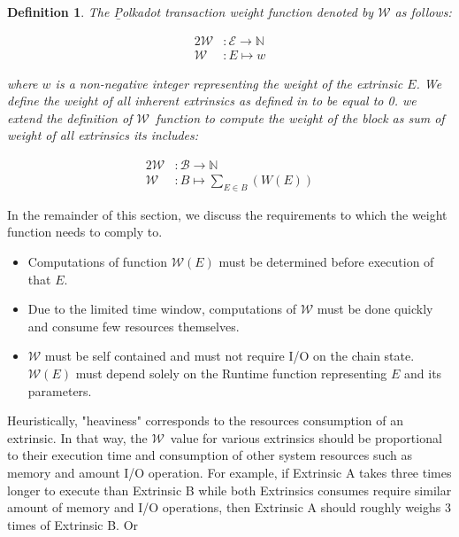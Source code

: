 \documentclass[11pt,a4paper]{article}
\newtheorem{definition}{Definition}
\newcommand{\TWF}{\ensuremath{\mathcal{W}}}
\begin{document}
\begin{definition}
  \label{defn:weight-function}
  The {\b Polkadot transaction weight function} denoted by $\mathcal{W}$ as follows:

  \begin{alignat*}{2}
    \mathcal{W} &: \mathcal{E} \rightarrow \mathbb{N} \\
    \mathcal{W} &: E \mapsto w
  \end{alignat*}

  where $w$ is a non-negative integer representing the weight of the extrinsic
  $E$. We define the weight of all inherent extrinsics as defined in
  \cite[Definition~3.3]{web30_technologies_foundation_polkadot_2020} to be equal
  to 0. we extend the definition of \TWF\ function to compute the weight of the
  block as sum of weight of all extrinsics its includes:

  \begin{alignat*}{2}
    \mathcal{W} &: \mathcal{B}\rightarrow \mathbb{N} \\
    \mathcal{W} &: B \mapsto \sum_{E\in B}(W(E))
  \end{alignat*}
  
\end{definition}

In the remainder of this section, we discuss the requirements to which the
weight function needs to comply to.

\begin{itemize}

\item Computations of function $\mathcal{W}(E)$  must be determined before
execution of that $E$.

\item Due to the limited time window, computations of $\TWF$ must be done
      quickly and consume few resources themselves.
\item $\TWF$ must be self contained and must not require I/O on the chain state.
$\TWF(E)$ must depend solely on the Runtime function representing $E$ and its
parameters.

\end{itemize}

Heuristically, "heaviness" corresponds to the resources consumption of an
extrinsic. In that way, the \TWF\ value for various extrinsics should be
proportional to their execution time and consumption of other system resources
such as memory and amount I/O operation. For example, if Extrinsic A takes three
times longer to execute than Extrinsic B while both Extrinsics consumes require
similar amount of memory and I/O operations, then Extrinsic A should roughly
weighs 3 times of Extrinsic B. Or
\end{document}
